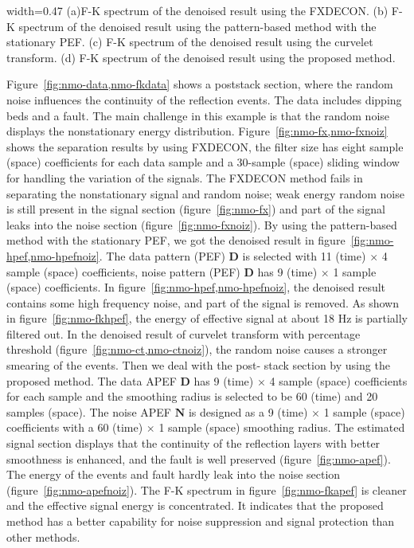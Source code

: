 {width=0.47\columnwidth}
{   (a)F-K spectrum of the denoised result using the FXDECON.
    (b) F-K spectrum of the denoised result using the pattern-based method with the stationary PEF.
    (c) F-K spectrum of the denoised result using the curvelet transform.
    (d) F-K spectrum of the denoised result using the proposed method.}

Figure~\ref{fig:nmo-data,nmo-fkdata} shows a poststack section, where the random
noise influences the continuity of the reflection events. The data includes dipping
beds and a fault. The main challenge in this example is that the random
noise displays the nonstationary energy distribution.
Figure~\ref{fig:nmo-fx,nmo-fxnoiz} shows the separation results by using FXDECON,
the filter size has eight sample (space) coefficients for each data sample and
a 30-sample (space) sliding window for handling the variation of the
signals. The FXDECON method fails in separating the nonstationary
signal and random noise; weak energy random noise is still present in
the signal section (figure~\ref{fig:nmo-fx}) and part of the
signal leaks into the noise section (figure~\ref{fig:nmo-fxnoiz}).
By using the pattern-based method with the stationary PEF, we got
the denoised result in figure~\ref{fig:nmo-hpef,nmo-hpefnoiz}.
The data pattern (PEF) $\mathbf{D}$ is selected with 11 (time) $\times$
4 sample (space) coefficients, noise pattern (PEF) $\mathbf{D}$ has 9
(time) $\times$ 1 sample (space) coefficients.
In figure~\ref{fig:nmo-hpef,nmo-hpefnoiz}, the denoised result contains some high
frequency noise, and part of the signal is removed. As shown in figure~\ref{fig:nmo-fkhpef},
the energy of effective signal at about 18 Hz is partially filtered out.
In the denoised result of curvelet transform with percentage threshold
(figure~\ref{fig:nmo-ct,nmo-ctnoiz}), the random noise causes a stronger smearing of
the events. Then we deal with the post- stack section by using the proposed method.
The data APEF $\mathbf{D}$ has 9 (time) $\times$ 4 sample (space)
coefficients for each sample and the smoothing radius is selected to
be 60 (time) and 20 samples (space). The noise APEF $\mathbf{N}$ is
designed as a 9 (time) $\times$ 1 sample (space) coefficients with a
60 (time) $\times$ 1 sample (space) smoothing radius. The estimated
signal section displays that the continuity of the reflection layers
with better smoothness is enhanced, and the fault is well preserved
(figure~\ref{fig:nmo-apef}). The energy of the events and fault hardly
leak into the noise section (figure~\ref{fig:nmo-apefnoiz}).
The F-K spectrum in figure~\ref{fig:nmo-fkapef} is cleaner and the effective signal
energy is concentrated. It indicates that the proposed method has a
better capability for noise suppression and signal protection than
other methods.

